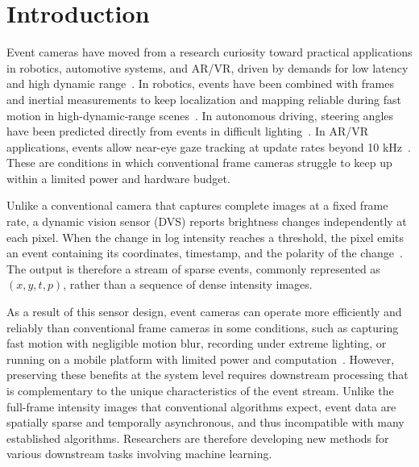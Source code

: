 \section{Introduction}
\label{sec:introduction}


Event cameras have moved from a research curiosity toward practical applications in robotics, automotive systems, and AR/VR, driven by demands for low latency and high dynamic range~\cite{gallego2022event}. In robotics, events have been combined with frames and inertial measurements to keep localization and mapping reliable during fast motion in high-dynamic-range scenes~\cite{vidal2018ultimate}. In autonomous driving, steering angles have been predicted directly from events in difficult lighting~\cite{maqueda2018steering}. In AR/VR applications, events allow near-eye gaze tracking at update rates beyond 10 kHz~\cite{angelopoulos2021gaze}. These are conditions in which conventional frame cameras struggle to keep up within a limited power and hardware budget.


Unlike a conventional camera that captures complete images at a fixed frame rate, a dynamic vision sensor (DVS) reports brightness changes independently at each pixel. When the change in log intensity reaches a threshold, the pixel emits an event containing its coordinates, timestamp, and the polarity of the change~\cite{lichtsteiner2008dvs}. The output is therefore a stream of sparse events, commonly represented as $(x,y,t,p)$, rather than a sequence of dense intensity images.

As a result of this sensor design, event cameras can operate more efficiently and reliably than conventional frame cameras in some conditions, such as capturing fast motion with negligible motion blur, recording under extreme lighting, or running on a mobile platform with limited power and computation~\cite{gallego2022event}. However, preserving these benefits at the system level requires downstream processing that is complementary to the unique characteristics of the event stream. Unlike the full-frame intensity images that conventional algorithms expect, event data are spatially sparse and temporally asynchronous, and thus incompatible with many established algorithms. Researchers are therefore developing new methods for various downstream tasks involving machine learning.


